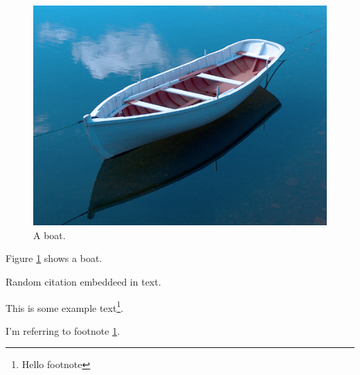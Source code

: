 \documentclass{article}
\begin{document}
\begin{figure}
  \includegraphics[width=\linewidth]{boat.jpg}
  \caption{A boat.}
  \label{fig:boat1}
\end{figure}

Figure \ref{fig:boat1} shows a boat.

Random citation \cite{DUMMY:1} embeddeed in text.

This is some example text\footnote{\label{myfootnote}Hello footnote}.

I'm referring to footnote \ref{myfootnote}.

\newpage



\end{document}
